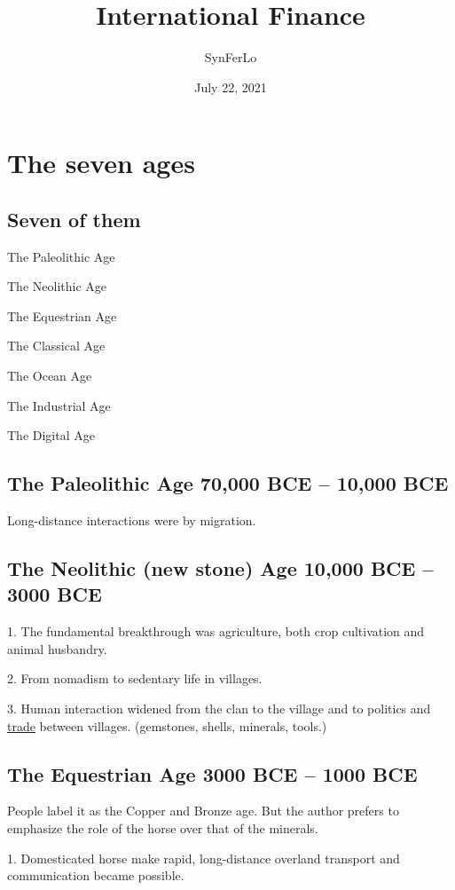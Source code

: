 \documentclass[12pt]{article}
\title{International Finance}
\author{SynFerLo}
\date{July 22, 2021}
\begin{document}
\maketitle
\newpage





\section{The seven ages}

\subsection{Seven of them}
The Paleolithic Age

The Neolithic Age

The Equestrian Age

The Classical Age

The Ocean Age

The Industrial Age

The Digital Age


\subsection{The Paleolithic Age 70,000 BCE -- 10,000 BCE}
Long-distance interactions were by migration.

\subsection{The Neolithic (new stone) Age 10,000 BCE -- 3000 BCE}
1. The fundamental breakthrough was agriculture, both crop cultivation
and animal husbandry.

2. From nomadism to sedentary life in villages.

3. Human interaction widened from the clan to the village and to
politics and {\underline {trade}} between villages. (gemstones, shells,
minerals, tools.)


\subsection{The Equestrian Age 3000 BCE -- 1000 BCE}
People label it as the Copper and Bronze age. But the author prefers
to emphasize the role of the horse over that of the minerals.

1. Domesticated horse make rapid, long-distance overland transport
and communication became possible.
\end{document}
